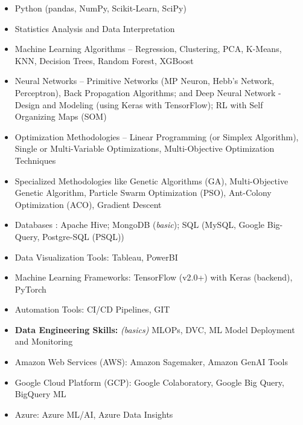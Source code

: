 
%




\begin{multicols}{2}
	\begin{itemize}
		\item Python (pandas, NumPy, Scikit-Learn, SciPy)
		\item Statistics Analysis and Data Interpretation
		\item Machine Learning Algorithms – Regression, Clustering, PCA, K-Means, KNN, Decision Trees, Random Forest, XGBoost
		\item Neural Networks – Primitive Networks (MP Neuron, Hebb’s Network, Perceptron), Back Propagation Algorithms; and Deep Neural Network - Design and Modeling (using Keras with TensorFlow); RL with Self Organizing Maps (SOM)
		\item Optimization Methodologies – Linear Programming (or Simplex Algorithm), Single or Multi-Variable Optimizations, Multi-Objective Optimization Techniques
		\item \nohyphens{Specialized Methodologies like Genetic Algorithms (GA), Multi-Objective Genetic Algorithm, Particle Swarm Optimization (PSO), Ant-Colony Optimization (ACO), Gradient Descent}
		\item Databases : Apache Hive; MongoDB (\textit{basic}); SQL (MySQL, Google Big-Query, Postgre-SQL (PSQL))
		\item Data Visualization Tools: Tableau, PowerBI
        \item Machine Learning Frameworks: TensorFlow (v2.0+) with Keras (backend), PyTorch
        \item Automation Tools: CI/CD Pipelines, GIT
		\item \textbf{Data Engineering Skills:} \textit{(basics)} MLOPs, DVC, ML Model Deployment and Monitoring
	\end{itemize}

    \begin{itemize}
        \item Amazon Web Services (AWS): Amazon Sagemaker, Amazon GenAI Tools
        \item Google Cloud Platform (GCP): Google Colaboratory, Google Big Query, BigQuery ML
        \item Azure: Azure ML/AI, Azure Data Insights
    \end{itemize}


\end{multicols}
